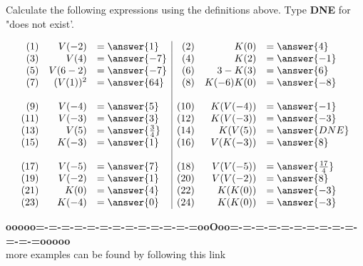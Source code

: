 \documentclass{ximera}
\begin{document}
\begin{question}


Calculate the following expressions using the definitions above. Type \textbf{DNE} for "does not exist'.


\[
\begin{array}{rrl|rrl}
(1) & V(-2)  & = \answer{1} &  (2) &  K(0) & =\answer{4} \\
(3) & V(4)  & = \answer{-7} &  (4) &  K(2) & =\answer{-1} \\
(5) & V(6-2)  & = \answer{-7} &  (6) &  3-K(3) & =\answer{6} \\
(7) & (V(1))^2  & = \answer{64} &  (8) &  K(-6)K(0) & =\answer{-8} \\
    &           &               &      &            & \\
(9) & V(-4)  & = \answer{5} &  (10) &  K(V(-4)) & =\answer{-1} \\
(11) & V(-3)  & = \answer{3} &  (12) &  K(V(-3)) & =\answer{-3} \\
(13) & V(5)  & = \answer{\frac{3}{4}} &  (14) &  K(V(5)) & =\answer{DNE} \\
(15) & K(-3)  & = \answer{1} &  (16) &  V(K(-3)) & =\answer{8} \\
     &        &              &       &           & \\
(17) & V(-5)  & = \answer{7} &  (18) &  V(V(-5)) & =\answer{\frac{17}{4}} \\
(19) & V(-2)  & = \answer{1} &  (20) &  V(V(-2)) & =\answer{8} \\
(21) & K(0)  & = \answer{4} &  (22) &  K(K(0)) & =\answer{-3} \\
(23) & K(-4)  & = \answer{0} &  (24) &  K(K(0)) & =\answer{-3} 
\end{array}
\]


\end{question}



















\begin{center}
\textbf{\textcolor{green!50!black}{ooooo=-=-=-=-=-=-=-=-=-=-=-=-=ooOoo=-=-=-=-=-=-=-=-=-=-=-=-=ooooo}} \\

more examples can be found by following this link\\ 

\end{center}
\end{document}
